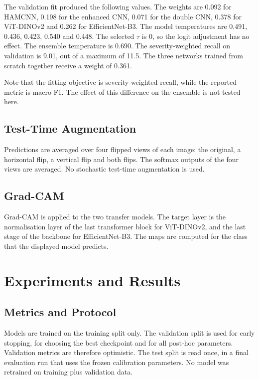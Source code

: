 \documentclass[10pt,twocolumn]{article}
\begin{document}
The validation fit produced the following values. The weights are 0.092 for HAMCNN, 0.198 for the enhanced CNN, 0.071 for the double CNN, 0.378 for ViT-DINOv2 and 0.262 for EfficientNet-B3. The model temperatures are 0.491, 0.436, 0.423, 0.540 and 0.448. The selected $\tau$ is 0, so the logit adjustment has no effect. The ensemble temperature is 0.690. The severity-weighted recall on validation is 9.01, out of a maximum of 11.5. The three networks trained from scratch together receive a weight of 0.361.

Note that the fitting objective is severity-weighted recall, while the reported metric is macro-F1. The effect of this difference on the ensemble is not tested here.

\subsection{Test-Time Augmentation}
Predictions are averaged over four flipped views of each image: the original, a horizontal flip, a vertical flip and both flips. The softmax outputs of the four views are averaged. No stochastic test-time augmentation is used.

\subsection{Grad-CAM}
Grad-CAM \cite{selvaraju2017gradcam} is applied to the two transfer models. The target layer is the normalisation layer of the last transformer block for ViT-DINOv2, and the last stage of the backbone for EfficientNet-B3. The maps are computed for the class that the displayed model predicts.

\section{Experiments and Results}
\label{sec:results}

\subsection{Metrics and Protocol}
Models are trained on the training split only. The validation split is used for early stopping, for choosing the best checkpoint and for all post-hoc parameters. Validation metrics are therefore optimistic. The test split is read once, in a final evaluation run that uses the frozen calibration parameters. No model was retrained on training plus validation data.
\end{document}

